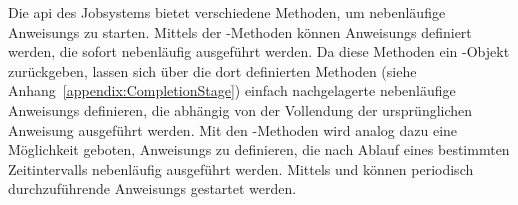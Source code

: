 Die \acs{api} des Jobsystems bietet verschiedene Methoden, um nebenläufige \glspl{Anweisung} zu starten. Mittels der -Methoden können \glspl{Anweisung} definiert werden, die sofort nebenläufig ausgeführt werden. Da diese Methoden ein \classCompletableFuture{}-Objekt zurückgeben, lassen sich über die dort definierten Methoden (siehe Anhang~\vref{appendix:CompletionStage}) einfach nachgelagerte nebenläufige \glspl{Anweisung} definieren, die abhängig von der Vollendung der ursprünglichen \gls{Anweisung} ausgeführt werden. Mit den -Methoden wird analog dazu eine Möglichkeit geboten, \glspl{Anweisung} zu definieren, die nach Ablauf eines bestimmten Zeitintervalls nebenläufig ausgeführt werden. Mittels  und  können periodisch durchzuführende \glspl{Anweisung} gestartet werden.